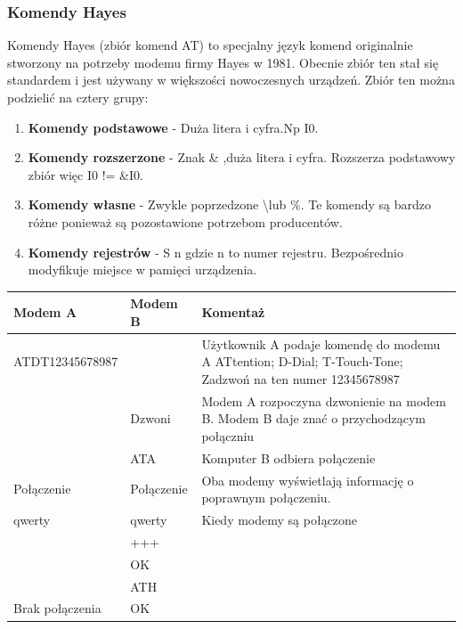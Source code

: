 \documentclass{article}
\begin{document}
            \subsubsection{Komendy Hayes}
                Komendy Hayes (zbiór komend AT) to specjalny język komend originalnie stworzony
                na potrzeby modemu firmy Hayes w 1981. Obecnie zbiór ten stał się standardem
                i jest używany w większości nowoczesnych urządzeń. Zbiór ten można podzielić na 
                cztery grupy:
                \begin{enumerate}
                    \item \textbf{Komendy podstawowe} - Duża litera i cyfra.Np I0.
                    \item \textbf{Komendy rozszerzone} - Znak \& ,duża litera i cyfra. Rozszerza podstawowy 
                        zbiór więc I0 != \&I0.
                    \item \textbf{Komendy własne} - Zwykle poprzedzone \textbackslash lub \%. Te komendy są 
                        bardzo różne ponieważ są pozostawione potrzebom producentów.
                    \item \textbf{Komendy rejestrów} - S n gdzie n to numer rejestru. Bezpośrednio modyfikuje
                        miejsce w pamięci urządzenia.
                \end{enumerate}
                \begin{table}
                    \begin{tabular}{|l|l|p{8cm}|}
                        \hline
                        Modem A & Modem B & Komentaż \\ \hline
                        ATDT12345678987 & & Użytkownik A podaje komendę do modemu A ATtention; D-Dial; T-Touch-Tone;
                        Zadzwoń na ten numer 12345678987 \\ \hline
                        & Dzwoni & Modem A rozpoczyna dzwonienie na modem B. Modem B daje znać o przychodzącym 
                        połączniu\\ \hline
                        & ATA & Komputer B odbiera połączenie\\ \hline
                        Połączenie & Połączenie & Oba modemy wyświetlają informację o poprawnym połączeniu.\\ \hline
                        qwerty & qwerty & Kiedy modemy są połączone\\ \hline
                        & +++ & \\ \hline
                        & OK & \\ \hline
                        & ATH & \\ \hline
                        Brak połączenia & OK & \\ \hline
                    \end{tabular}
                \end{table}
\end{document}
